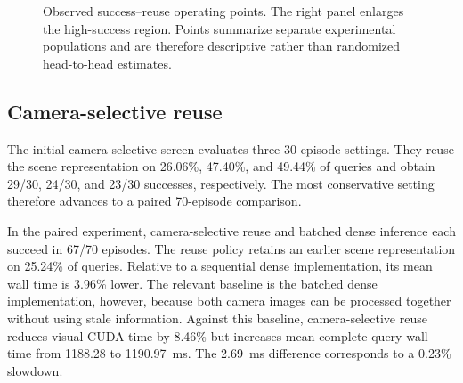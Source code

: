 \documentclass[journal]{IEEEtran}
\begin{document}
\begin{figure}[t]
\centering
{}
\caption{Observed success--reuse operating points. The right panel enlarges the high-success region. Points summarize separate experimental populations and are therefore descriptive rather than randomized head-to-head estimates.}
\label{fig:frontier}
\end{figure}

\subsection{Camera-selective reuse}
The initial camera-selective screen evaluates three 30-episode settings. They reuse the scene representation on 26.06\%, 47.40\%, and 49.44\% of queries and obtain 29/30, 24/30, and 23/30 successes, respectively. The most conservative setting therefore advances to a paired 70-episode comparison.

In the paired experiment, camera-selective reuse and batched dense inference each succeed in 67/70 episodes. The reuse policy retains an earlier scene representation on 25.24\% of queries. Relative to a sequential dense implementation, its mean wall time is 3.96\% lower. The relevant baseline is the batched dense implementation, however, because both camera images can be processed together without using stale information. Against this baseline, camera-selective reuse reduces visual CUDA time by 8.46\% but increases mean complete-query wall time from 1188.28 to 1190.97~ms. The 2.69~ms difference corresponds to a 0.23\% slowdown.
\end{document}
